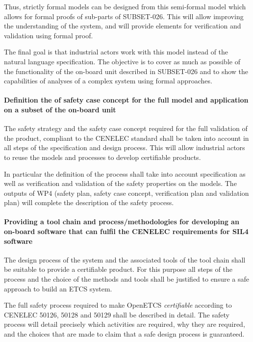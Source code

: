 \documentclass{template/openetcs_article}
\begin{document}
Thus, strictly formal models can be designed from this semi-formal model which allows for formal proofs of sub-parts of SUBSET-026. This will allow improving the understanding of the system, and will provide elements for verification and validation using formal proof.

The final goal is that industrial actors work with this model instead of the
natural language specification.
The objective is to cover as much as possible of the functionality of the on-board unit described in SUBSET-026 and to show the capabilities of analyses of a complex system using formal approaches.


\paragraph{Definition the of safety case concept for the full model and application on a subset of the on-board unit}
The safety strategy and the safety case concept required for the full validation of the product, compliant to the CENELEC standard shall be taken into account in all steps of the specification and design process. This will allow industrial actors to reuse the models and processes to develop certifiable products.

In particular the definition of the process shall take into account specification as well as verification and validation of the safety properties on the models. The outputs of WP4 (safety plan, safety case concept, verification plan and validation plan) will complete the description of the safety process.


\paragraph{Providing a tool chain and process/methodologies for developing
an on-board software that can fulfil the CENELEC requirements for SIL4 software}

The design process of the system and the associated tools of the tool chain shall be suitable to provide a certifiable product. For this purpose all steps of the process and the choice of the methods and tools shall be justified to ensure a safe approach to build an ETCS system.

The full safety process required to make OpenETCS \emph{certifiable} according to CENELEC 50126, 50128 and 50129 shall be described in detail. The safety process will detail precisely which activities are required, why they are required, and the choices that are made to claim that a safe design process is guaranteed.
\end{document}

